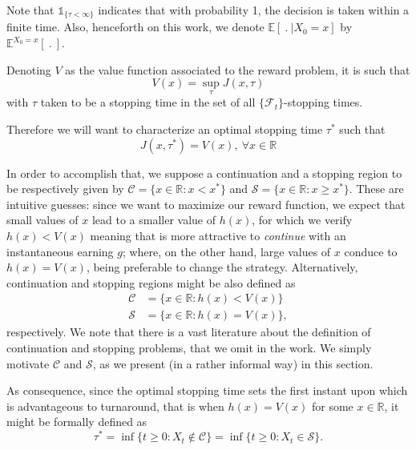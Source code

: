 Note that $ \mathds{1}_{ \{\tau< \infty \}}$ indicates that with probability 1, the decision is taken within a finite time. Also, henceforth on this work, we denote $\mathds{E} \left[ \ . \ | X_0=x \right]$ by $\mathds{E}^{X_0=x}\left[ \ . \ \right]$.

Denoting $V$ as the value function associated to the reward problem, it is such that
\begin{equation}
V(x)=\sup_\tau J(x,\tau)
\label{bc_v1}
\end{equation}
with $\tau$ taken to be a stopping time in the set of all $\{\mathcal{F}_t\}$-stopping times.



Therefore we will want to characterize an optimal stopping time $\tau^*$ such that 
\begin{equation}
	J(x,\tau^*)=V(x),\ \forall x \in \mathds{R}
	\label{bc_v}
\end{equation}

In order to accomplish that, we suppose a continuation and a stopping region to be respectively given by $\mathcal{C}=\{ x\in \mathds{R}: x<x^* \}$ and $\mathcal{S}=\{ x\in \mathds{R}: x\geq x^* \}$. These are intuitive guesses: since we want to maximize our reward function, we expect that small values of $x$ lead to a smaller value of $h(x)$, for which we verify $h(x)<V(x)$ meaning that is more attractive to \textit{continue} with an instantaneous earning $g$; where, on the other hand, large values of $x$ conduce to $h(x)=V(x)$, being preferable to change the strategy. Alternatively, continuation and stopping regions might be also defined as
\begin{align}
 \mathcal{C}&=\{ x\in \mathds{R}: h(x)<V(x) \} \label{bc_c}\\
 \mathcal{S}&=\{ x\in \mathds{R}: h(x)=V(x) \} \label{bc_s},
\end{align}
respectively. We note that there is a vast literature about the definition of continuation and stopping problems, that we omit in the work. We simply motivate $\mathcal{C}$ and $\mathcal{S}$, as we present (in a rather informal way) in this section.

As consequence, since the optimal stopping time sets the first instant upon which is advantageous to turnaround, that is when $h(x)=V(x)$ for some $x \in \mathds{R}$, it might be formally defined as
\begin{equation}
\tau^*=\inf \{ t \geq 0: X_t \notin \mathcal{C} \}=\inf \{ t \geq 0: X_t \in \mathcal{S} \}.
\label{stoptime}
\end{equation}


